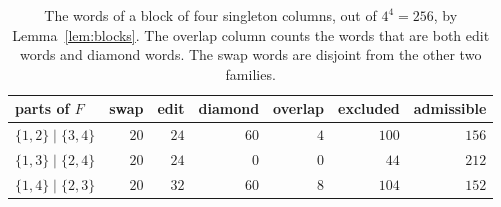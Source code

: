 \begin{table}[t]
\centering\small
\begin{tabular}{@{}lrrrrrr@{}}
\toprule
parts of $F$ & swap & edit & diamond & overlap & excluded & admissible\\
\midrule
$\{1,2\}\mid\{3,4\}$ & $20$ & $24$ & $60$ & $4$ & $100$ & $156$\\
$\{1,3\}\mid\{2,4\}$ & $20$ & $24$ & $0$ & $0$ & $44$ & $212$\\
$\{1,4\}\mid\{2,3\}$ & $20$ & $32$ & $60$ & $8$ & $104$ & $152$\\
\bottomrule
\end{tabular}
\caption{The words of a block of four singleton columns, out of $4^4=256$, by Lemma~\ref{lem:blocks}. The overlap column counts the words that are both edit words and diamond words. The swap words are disjoint from the other two families.}
\label{tab:fourblocks}
\end{table}

